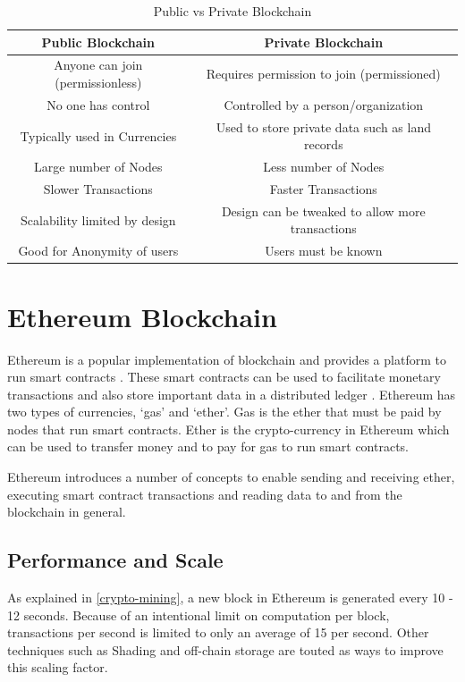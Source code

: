 \documentclass[11pt,openright]{report}
\begin{document}
\begin{table}[!htbp]
	\renewcommand{\arraystretch}{1.3}
	\caption{Public vs Private Blockchain}
	\label{pub_priv_blockchains}
	\centering
	\begin{tabular}{|c|c|}
		\hline
		\bfseries Public Blockchain & \bfseries Private Blockchain \\
		\hline\hline
		Anyone can join (permissionless) & Requires permission to join (permissioned) \\ \hline
	    No one has control & Controlled by a person/organization \\ \hline
        Typically used in Currencies & Used to store private data such as land records \\ \hline
        Large number of Nodes & Less number of Nodes \\ \hline
        Slower Transactions  & Faster Transactions \\ \hline
        Scalability limited by design  & Design can be tweaked to allow more transactions \\ \hline
        Good for Anonymity of users  & Users must be known \\ \hline
	\end{tabular}
\end{table}



\section{Ethereum Blockchain}
Ethereum is a popular implementation of blockchain and provides a platform to run smart contracts \cite{buterin2013whitepaper}. These smart contracts can be used to facilitate monetary transactions and also store important data in a distributed ledger \cite{egbertsen2016replacing}. Ethereum has two types of currencies, ‘gas’ and ‘ether’. Gas is the ether that must be paid by nodes that run smart contracts. Ether is the crypto-currency in Ethereum which can be used to transfer money and to pay for gas to run smart contracts.

Ethereum introduces a number of concepts to enable sending and receiving ether, executing smart contract transactions and reading data to and from the blockchain in general.

\subsection{Performance and Scale}
As explained in \ref{crypto-mining}, a new block in Ethereum is generated every 10 - 12 seconds. Because of an intentional limit on computation per block, transactions per second is limited to only an average of 15 per second. Other techniques such as Shading and off-chain storage are touted as ways to improve this scaling factor. 
\end{document}
